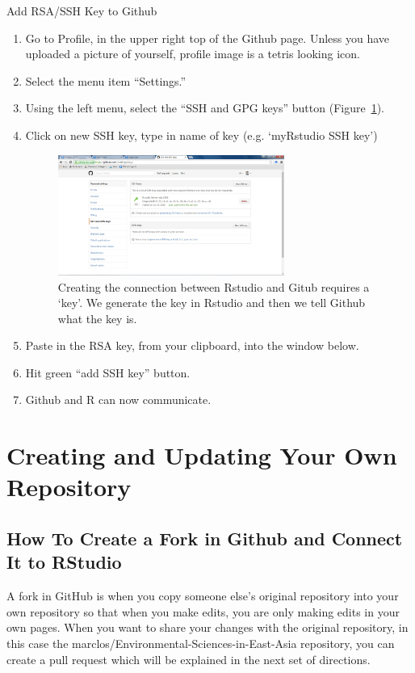 \documentclass[12pt]{../SOP4_alpha}\usepackage[]{graphicx}\usepackage[]{color}
\begin{document}
\NP Add RSA/SSH Key to Github
  \begin{enumerate}
  \item Go to Profile, in the upper right top of the Github page. Unless you have uploaded a picture of yourself, profile image is a tetris looking icon.
  \item Select the menu item ``Settings.''
  \item Using the left menu, select the ``SSH and GPG keys'' button (Figure~\ref{fig:githubkey}).
  \item Click on new SSH key, type in name of key (e.g. `myRstudio SSH key')
  
\begin{figure}
\centering
\includegraphics[width=0.7\textwidth]{graphics/Github_SavedSSH.jpg}
\caption{Creating the connection between Rstudio and Gitub requires a `key'. We generate the key in Rstudio and then we tell Github what the key is.}
\label{fig:githubkey}
\end{figure}

  \item Paste in the RSA key, from your clipboard, into the window below.
  \item Hit green ``add SSH key'' button.
  \item Github and R can now communicate.
  \end{enumerate}

\section{Creating and Updating Your Own Repository}

\subsection {How To Create a Fork in Github and Connect It to RStudio}
A fork in GitHub is when you copy someone else’s original repository into your own repository so that when you make edits, you are only making edits in your own pages. When you want to share your changes with the original repository, in this case the marclos/Environmental-Sciences-in-East-Asia repository, you can create a pull request which will be explained in the next set of directions. 
\end{document}
